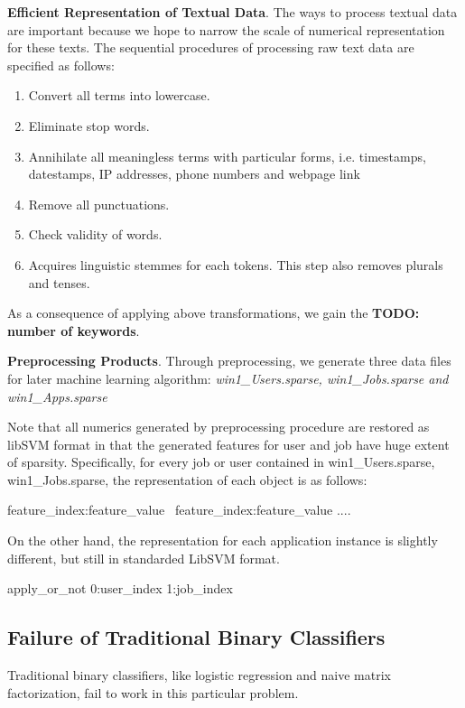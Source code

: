 \documentclass{article} %
\begin{document}
{\bf Efficient Representation of Textual Data}.
The ways to process textual data are important because we hope to narrow the
scale of numerical representation for these texts.  The sequential procedures
of processing raw text data are specified as follows:
\begin{enumerate}[label=(\roman*)]
  \item{Convert all terms into lowercase.}
  \item{Eliminate stop words.}
  \item{Annihilate all meaningless terms with particular forms, i.e.
          timestamps, datestamps, IP addresses, phone numbers and webpage link}
  \item{Remove all punctuations.}
  \item{Check validity of words.}
  \item{Acquires linguistic stemmes for each tokens. This step also removes
          plurals and tenses.}
\end{enumerate}
As a consequence of applying above transformations, we gain the {\bf TODO: number of
keywords}. 

{\bf Preprocessing Products}.
Through preprocessing, we generate three data files for later machine learning
algorithm: {\it win1\_Users.sparse, win1\_Jobs.sparse and win1\_Apps.sparse}

Note that all numerics generated by preprocessing procedure are restored as libSVM
format in that the generated features for user and job have huge extent of sparsity. 
Specifically, for every job or user contained in win1\_Users.sparse,
win1\_Jobs.sparse, the representation of each object is as follows:
\begin{center}
    feature\_index:feature\_value \ feature\_index:feature\_value .... 
\end{center}
On the other hand, the representation for each application instance is slightly different,
but still in standarded LibSVM format. 
\begin{center}
    apply\_or\_not 0:user\_index 1:job\_index
\end{center}

\subsection{Failure of Traditional Binary Classifiers} %
Traditional binary classifiers, like logistic regression and naive matrix
factorization, fail to work in this particular problem. 
\end{document}
